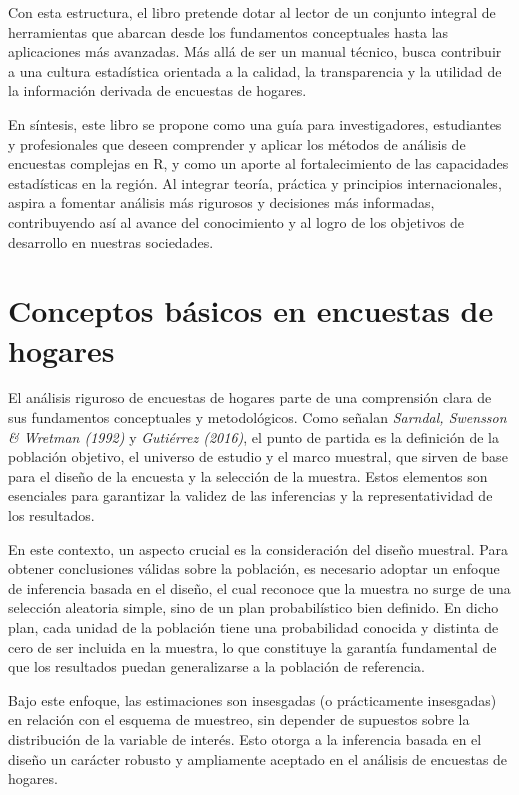 \documentclass[
  spanish,
  12pt,
]{book}
\begin{document}
Con esta estructura, el libro pretende dotar al lector de un conjunto integral de herramientas que abarcan desde los fundamentos conceptuales hasta las aplicaciones más avanzadas. Más allá de ser un manual técnico, busca contribuir a una cultura estadística orientada a la calidad, la transparencia y la utilidad de la información derivada de encuestas de hogares.

En síntesis, este libro se propone como una guía para investigadores, estudiantes y profesionales que deseen comprender y aplicar los métodos de análisis de encuestas complejas en R, y como un aporte al fortalecimiento de las capacidades estadísticas en la región. Al integrar teoría, práctica y principios internacionales, aspira a fomentar análisis más rigurosos y decisiones más informadas, contribuyendo así al avance del conocimiento y al logro de los objetivos de desarrollo en nuestras sociedades.

\chapter{Conceptos básicos en encuestas de hogares}\label{conceptos-buxe1sicos-en-encuestas-de-hogares}

El análisis riguroso de encuestas de hogares parte de una comprensión clara de sus fundamentos conceptuales y metodológicos. Como señalan \emph{Sarndal, Swensson \& Wretman (1992)} y \emph{Gutiérrez (2016)}, el punto de partida es la definición de la población objetivo, el universo de estudio y el marco muestral, que sirven de base para el diseño de la encuesta y la selección de la muestra. Estos elementos son esenciales para garantizar la validez de las inferencias y la representatividad de los resultados.

En este contexto, un aspecto crucial es la consideración del diseño muestral. Para obtener conclusiones válidas sobre la población, es necesario adoptar un enfoque de inferencia basada en el diseño, el cual reconoce que la muestra no surge de una selección aleatoria simple, sino de un plan probabilístico bien definido. En dicho plan, cada unidad de la población tiene una probabilidad conocida y distinta de cero de ser incluida en la muestra, lo que constituye la garantía fundamental de que los resultados puedan generalizarse a la población de referencia.

Bajo este enfoque, las estimaciones son insesgadas (o prácticamente insesgadas) en relación con el esquema de muestreo, sin depender de supuestos sobre la distribución de la variable de interés. Esto otorga a la inferencia basada en el diseño un carácter robusto y ampliamente aceptado en el análisis de encuestas de hogares.
\end{document}
